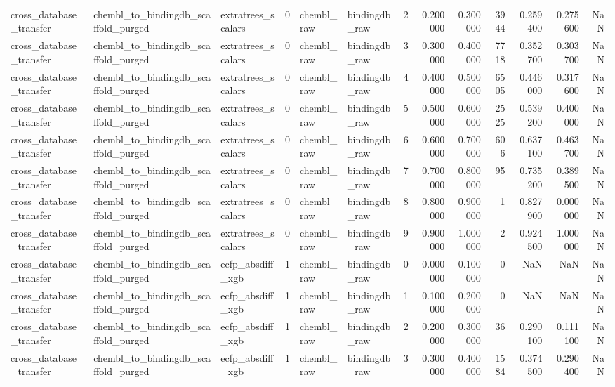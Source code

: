 \begin{longtable}{lllrllrrrrrrr}
cross\_database\_transfer & chembl\_to\_bindingdb\_scaffold\_purged & extratrees\_scalars & 0 & chembl\_raw & bindingdb\_raw & 2 & 0.200000 & 0.300000 & 3944 & 0.259400 & 0.275600 & NaN \\
cross\_database\_transfer & chembl\_to\_bindingdb\_scaffold\_purged & extratrees\_scalars & 0 & chembl\_raw & bindingdb\_raw & 3 & 0.300000 & 0.400000 & 7718 & 0.352700 & 0.303700 & NaN \\
cross\_database\_transfer & chembl\_to\_bindingdb\_scaffold\_purged & extratrees\_scalars & 0 & chembl\_raw & bindingdb\_raw & 4 & 0.400000 & 0.500000 & 6505 & 0.446000 & 0.317600 & NaN \\
cross\_database\_transfer & chembl\_to\_bindingdb\_scaffold\_purged & extratrees\_scalars & 0 & chembl\_raw & bindingdb\_raw & 5 & 0.500000 & 0.600000 & 2525 & 0.539200 & 0.400000 & NaN \\
cross\_database\_transfer & chembl\_to\_bindingdb\_scaffold\_purged & extratrees\_scalars & 0 & chembl\_raw & bindingdb\_raw & 6 & 0.600000 & 0.700000 & 606 & 0.637100 & 0.463700 & NaN \\
cross\_database\_transfer & chembl\_to\_bindingdb\_scaffold\_purged & extratrees\_scalars & 0 & chembl\_raw & bindingdb\_raw & 7 & 0.700000 & 0.800000 & 95 & 0.735200 & 0.389500 & NaN \\
cross\_database\_transfer & chembl\_to\_bindingdb\_scaffold\_purged & extratrees\_scalars & 0 & chembl\_raw & bindingdb\_raw & 8 & 0.800000 & 0.900000 & 1 & 0.827900 & 0.000000 & NaN \\
cross\_database\_transfer & chembl\_to\_bindingdb\_scaffold\_purged & extratrees\_scalars & 0 & chembl\_raw & bindingdb\_raw & 9 & 0.900000 & 1.000000 & 2 & 0.924500 & 1.000000 & NaN \\
cross\_database\_transfer & chembl\_to\_bindingdb\_scaffold\_purged & ecfp\_absdiff\_xgb & 1 & chembl\_raw & bindingdb\_raw & 0 & 0.000000 & 0.100000 & 0 & NaN & NaN & NaN \\
cross\_database\_transfer & chembl\_to\_bindingdb\_scaffold\_purged & ecfp\_absdiff\_xgb & 1 & chembl\_raw & bindingdb\_raw & 1 & 0.100000 & 0.200000 & 0 & NaN & NaN & NaN \\
cross\_database\_transfer & chembl\_to\_bindingdb\_scaffold\_purged & ecfp\_absdiff\_xgb & 1 & chembl\_raw & bindingdb\_raw & 2 & 0.200000 & 0.300000 & 36 & 0.290100 & 0.111100 & NaN \\
cross\_database\_transfer & chembl\_to\_bindingdb\_scaffold\_purged & ecfp\_absdiff\_xgb & 1 & chembl\_raw & bindingdb\_raw & 3 & 0.300000 & 0.400000 & 1584 & 0.374500 & 0.290400 & NaN \\

\end{longtable}
